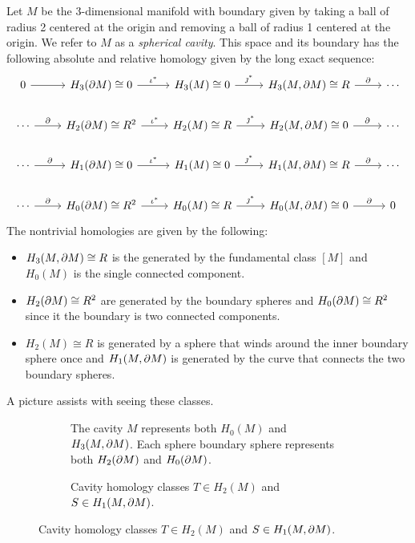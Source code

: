 \documentclass{article}
\begin{document}
Let $M$ be the 3-dimensional manifold with boundary given by taking a ball of radius 2 centered at the origin and removing a ball of radius 1 centered at the origin. We refer to $M$ as a \emph{spherical cavity}. This space and its boundary has the following absolute and relative homology given by the long exact sequence:
\[
\begin{tikzcd}
0 \arrow[r]                          & H_3(\partial M)\cong 0 \arrow[r, "\iota^*"]            & H_3(M)\cong 0 \arrow[r, "\jmath^*"]           & {H_3(M,\partial M)\cong R} \arrow[r, "\partial"] & \cdots \\
\cdots \arrow[r, "\partial"] & H_2(\partial M)\cong R^2 \arrow[r, "\iota^*"] & H_2(M) \cong R \arrow[r, "\jmath^*"] & {H_2(M,\partial M)\cong 0} \arrow[r, "\partial"]          & \cdots \\
\cdots \arrow[r, "\partial"] & H_1(\partial M)\cong 0 \arrow[r, "\iota^*"]   & H_1(M)\cong 0 \arrow[r, "\jmath^*"]           & {H_1(M,\partial M)\cong R} \arrow[r, "\partial"] & \cdots \\
\cdots \arrow[r, "\partial"] & H_0(\partial M)\cong R^2 \arrow[r, "\iota^*"] & H_0(M)\cong R \arrow[r, "\jmath^*"]  & {H_0(M,\partial M)\cong 0} \arrow[r, "\partial"]          & 0    
\end{tikzcd}
\]
The nontrivial homologies are given by the following:
\begin{itemize}
    \item $H_3(M,{\partial M})\cong R$ is the generated by the fundamental class $[M]$ and $H_0(M)$ is the single connected component.
    \item $H_2({\partial M}) \cong R^2$ are generated by the boundary spheres and $H_0({\partial M}) \cong R^2$ since it the boundary is two connected components.
    \item $H_2(M) \cong R$ is generated by a sphere that winds around the inner boundary sphere once and $H_1(M,{\partial M})$ is generated by the curve that connects the two boundary spheres.
\end{itemize}
A picture assists with seeing these classes.
\begin{figure}[H]
     \centering
     \begin{subfigure}[b]{0.45\textwidth}
         \centering
    	
         \caption{The cavity $M$ represents both $H_0(M)$ and $H_3(M,{\partial M})$. Each sphere boundary sphere represents both $H_2({\partial M})$ and $H_0({\partial M})$.}
         \label{fig:cavity}
     \end{subfigure}
     \hfill
     \begin{subfigure}[b]{0.45\textwidth}
         \centering
         
         \caption{Cavity homology classes $T\in H_2(M)$ and $S\in H_1(M,{\partial M})$.}
         \label{fig:cavity_homology}
     \end{subfigure}
\end{figure}
\end{document}

